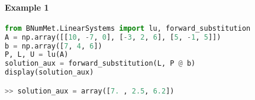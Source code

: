 \paragraph{Example 1}{
\begin{lstlisting}[language=Python]
from BNumMet.LinearSystems import lu, forward_substitution
A = np.array([[10, -7, 0], [-3, 2, 6], [5, -1, 5]])
b = np.array([7, 4, 6])
P, L, U = lu(A)
solution_aux = forward_substitution(L, P @ b)
display(solution_aux)

>> solution_aux = array([7. , 2.5, 6.2])
\end{lstlisting}
}
